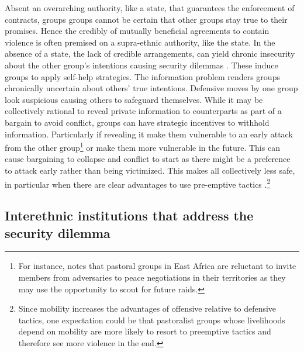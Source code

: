 Absent an overarching authority, like a state, that guarantees the enforcement
of contracts, groups groups cannot be certain that other groups stay true to
their promises. Hence the credibly of mutually beneficial agreements to contain
violence is often premised on a supra-ethnic authority, like the state.  In the
absence of a state, the lack of credible arrangements, can yield chronic
insecurity about the other group’s intentions causing security dilemmas
\citep[51]{Lake_1996}. These induce groups to apply self-help strategies. The
information problem renders groups chronically uncertain about others’ true
intentions. Defensive moves by one group look suspicious causing others to
safeguard themselves. While it may be collectively rational to reveal private
information to counterparts as part of a bargain to avoid conflict, groups can
have strategic incentives to withhold information. Particularly if revealing it
make them vulnerable to an early attack from the other group\footnote{For
	instance, \citet{Eaton_2008} notes that pastoral groups in East Africa
are reluctant to invite members from adversaries to peace negotiations in their
territories as they may use the opportunity to scout for future raids.} or make
them more vulnerable in the future. This can cause bargaining to collapse and
conflict to start as there might be a preference to attack early rather than
being victimized. This makes all collectively less safe, in particular when
there are clear advantages to use pre-emptive tactics
\citep[53]{Lake_1996}.\footnote{Since mobility increases the advantages of
	offensive relative to defensive tactics, one expectation could be that
	pastoralist groups whose livelihoods depend on mobility are more likely
to resort to preemptive tactics and therefore see  more violence in the end.} 

\subsection{Interethnic institutions that address the security dilemma} 
\label{Interethnic institutions that address the security dilemma}

